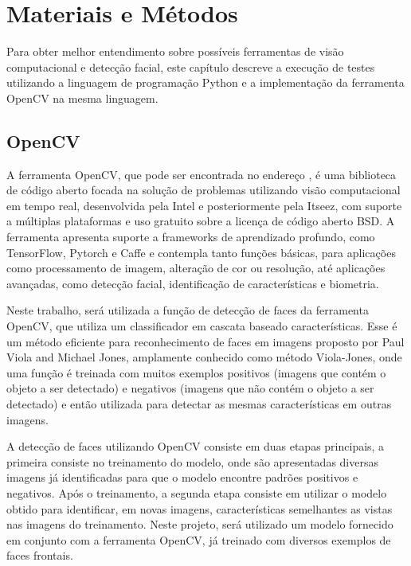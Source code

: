\chapter{Materiais e Métodos}\label{cap:ferramentas}

Para obter melhor entendimento sobre possíveis ferramentas de visão computacional e detecção facial, este capítulo descreve a execução de testes utilizando a linguagem de programação Python e a implementação da ferramenta OpenCV na mesma linguagem.

\section{OpenCV}

A ferramenta OpenCV, que pode ser encontrada no endereço , é uma biblioteca de código aberto focada na solução de problemas utilizando visão computacional em tempo real, desenvolvida pela Intel e posteriormente pela Itseez, com suporte a múltiplas plataformas e uso gratuito sobre a licença de código aberto BSD. A ferramenta apresenta suporte a frameworks de aprendizado profundo, como TensorFlow, Pytorch e Caffe e contempla tanto funções básicas, para aplicações como processamento de imagem, alteração de cor ou resolução, até aplicações avançadas, como detecção facial, identificação de características e biometria. \cite{wiki:OpenCV}

Neste trabalho, será utilizada a função de detecção de faces da ferramenta OpenCV, que utiliza um classificador em cascata baseado características. Esse é um método eficiente para reconhecimento de faces em imagens proposto por Paul Viola and Michael Jones, amplamente conhecido como método Viola-Jones, onde uma função é treinada com muitos exemplos positivos (imagens que contém o objeto a ser detectado) e negativos (imagens que não contém o objeto a ser detectado) e então utilizada para detectar as mesmas características em outras imagens. \cite{itseez2014theopencv}

A detecção de faces utilizando OpenCV consiste em duas etapas principais, a primeira consiste no treinamento do modelo, onde são apresentadas diversas imagens já identificadas para que o modelo encontre padrões positivos e negativos. Após o treinamento, a segunda etapa consiste em utilizar o modelo obtido para identificar, em novas imagens, características semelhantes as vistas nas imagens do treinamento. Neste projeto, será utilizado um modelo fornecido em conjunto com a ferramenta OpenCV, já treinado com diversos exemplos de faces frontais.

